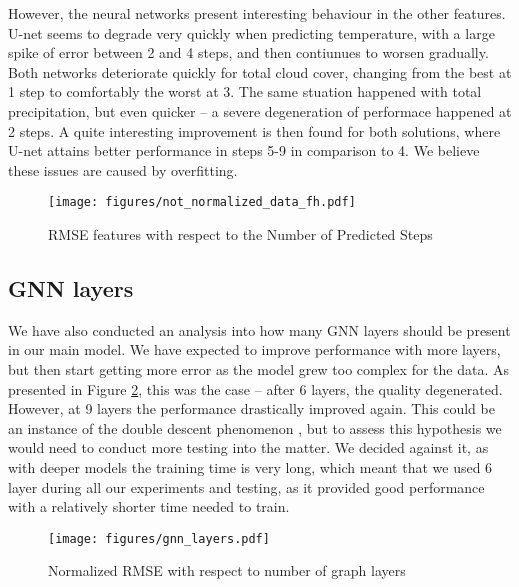 However, the neural networks present interesting behaviour in the other features. U-net seems to degrade very quickly when predicting temperature, with a large spike of error between 2 and 4 steps, and then contiunues to worsen gradually. Both networks deteriorate quickly for total cloud cover, changing from the best at 1 step to comfortably the worst at 3. The same stuation happened with total precipitation, but even quicker -- a severe degeneration of performace happened at 2 steps. A quite interesting improvement is then found for both solutions, where U-net attains better performance in steps 5-9 in comparison to 4. We believe these issues are caused by overfitting.

\begin{figure}[!ht]
    \centering
    \texttt{[image: figures/not\_normalized\_data\_fh.pdf]}
    \caption{RMSE features with respect to the Number of Predicted Steps}
    \label{fig:not-normalized-data-fh-plot}
\end{figure}

\FloatBarrier

\subsection{GNN layers}\label{chap:gnn-layers}
We have also conducted an analysis into how many GNN layers should be present in our main model. We have expected to improve performance with more layers, but then start getting more error as the model grew too complex for the data. As presented in Figure \ref{fig:gnn-layers}, this was the case -- after 6 layers, the quality degenerated. However, at 9 layers the performance drastically improved again. This could be an instance of the double descent phenomenon \cite{DBLP:journals/corr/abs-1912-02292}, but to assess this hypothesis we would need to conduct more testing into the matter. We decided against it, as with deeper models the training time is very long, which meant that we used 6 layer during all our experiments and testing, as it provided good performance with a relatively shorter time needed to train.

\begin{figure}[!ht]
    \centering
    \texttt{[image: figures/gnn\_layers.pdf]}
    \caption{Normalized RMSE with respect to number of graph layers}
    \label{fig:gnn-layers}
\end{figure}

\FloatBarrier

